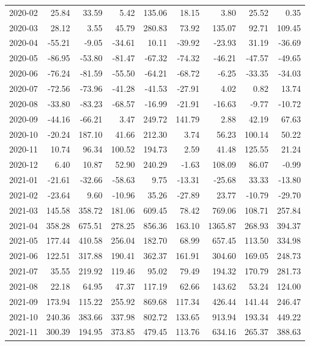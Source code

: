 \begin{table}[ht]
\begin{tabular}{lrrrrrrrr}
  2020-02 & 25.84 & 33.59 & 5.42 & 135.06 & 18.15 & 3.80 & 25.52 & 0.35 \\ 
  2020-03 & 28.12 & 3.55 & 45.79 & 280.83 & 73.92 & 135.07 & 92.71 & 109.45 \\ 
  2020-04 & -55.21 & -9.05 & -34.61 & 10.11 & -39.92 & -23.93 & 31.19 & -36.69 \\ 
  2020-05 & -86.95 & -53.80 & -81.47 & -67.32 & -74.32 & -46.21 & -47.57 & -49.65 \\ 
  2020-06 & -76.24 & -81.59 & -55.50 & -64.21 & -68.72 & -6.25 & -33.35 & -34.03 \\ 
  2020-07 & -72.56 & -73.96 & -41.28 & -41.53 & -27.91 & 4.02 & 0.82 & 13.74 \\ 
  2020-08 & -33.80 & -83.23 & -68.57 & -16.99 & -21.91 & -16.63 & -9.77 & -10.72 \\ 
  2020-09 & -44.16 & -66.21 & 3.47 & 249.72 & 141.79 & 2.88 & 42.19 & 67.63 \\ 
  2020-10 & -20.24 & 187.10 & 41.66 & 212.30 & 3.74 & 56.23 & 100.14 & 50.22 \\ 
  2020-11 & 10.74 & 96.34 & 100.52 & 194.73 & 2.59 & 41.48 & 125.55 & 21.24 \\ 
  2020-12 & 6.40 & 10.87 & 52.90 & 240.29 & -1.63 & 108.09 & 86.07 & -0.99 \\ 
  2021-01 & -21.61 & -32.66 & -58.63 & 9.75 & -13.31 & -25.68 & 33.33 & -13.80 \\ 
  2021-02 & -23.64 & 9.60 & -10.96 & 35.26 & -27.89 & 23.77 & -10.79 & -29.70 \\ 
  2021-03 & 145.58 & 358.72 & 181.06 & 609.45 & 78.42 & 769.06 & 108.71 & 257.84 \\ 
  2021-04 & 358.28 & 675.51 & 278.25 & 856.36 & 163.10 & 1365.87 & 268.93 & 394.37 \\ 
  2021-05 & 177.44 & 410.58 & 256.04 & 182.70 & 68.99 & 657.45 & 113.50 & 334.98 \\ 
  2021-06 & 122.51 & 317.88 & 190.41 & 362.37 & 161.91 & 304.60 & 169.05 & 248.73 \\ 
  2021-07 & 35.55 & 219.92 & 119.46 & 95.02 & 79.49 & 194.32 & 170.79 & 281.73 \\ 
  2021-08 & 22.18 & 64.95 & 47.37 & 117.19 & 62.66 & 143.62 & 53.24 & 124.00 \\ 
  2021-09 & 173.94 & 115.22 & 255.92 & 869.68 & 117.34 & 426.44 & 141.44 & 246.47 \\ 
  2021-10 & 240.36 & 383.66 & 337.98 & 802.72 & 133.65 & 913.94 & 193.34 & 449.22 \\ 
  2021-11 & 300.39 & 194.95 & 373.85 & 479.45 & 113.76 & 634.16 & 265.37 & 388.63 \\ 

\end{tabular}
\end{table}
